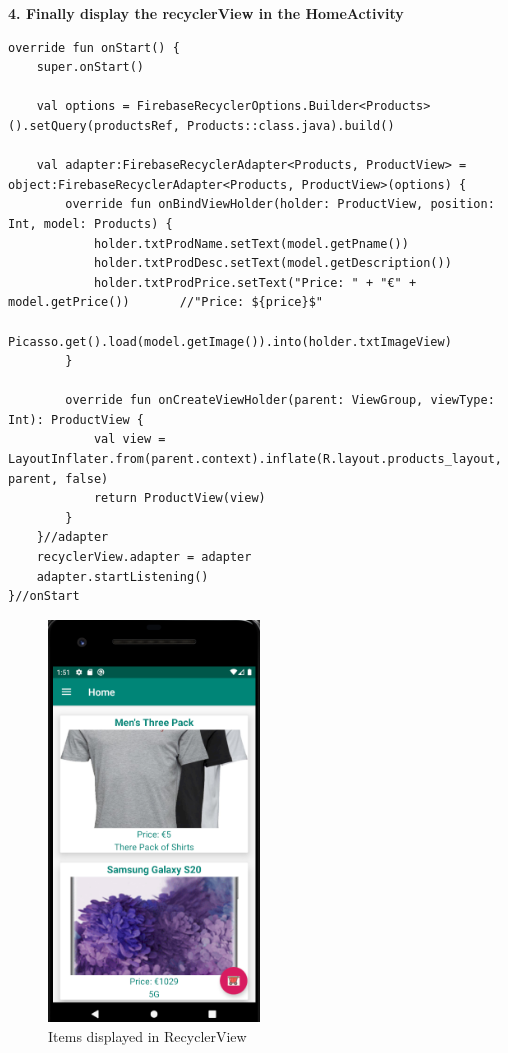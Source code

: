 \textbf{4. Finally display the recyclerView in the HomeActivity}
\begin{verbatim}
override fun onStart() {
    super.onStart()

    val options = FirebaseRecyclerOptions.Builder<Products>().setQuery(productsRef, Products::class.java).build()

    val adapter:FirebaseRecyclerAdapter<Products, ProductView> = object:FirebaseRecyclerAdapter<Products, ProductView>(options) {
        override fun onBindViewHolder(holder: ProductView, position: Int, model: Products) {
            holder.txtProdName.setText(model.getPname())
            holder.txtProdDesc.setText(model.getDescription())
            holder.txtProdPrice.setText("Price: " + "€" + model.getPrice())       //"Price: ${price}$"
            Picasso.get().load(model.getImage()).into(holder.txtImageView)
        }

        override fun onCreateViewHolder(parent: ViewGroup, viewType: Int): ProductView {
            val view = LayoutInflater.from(parent.context).inflate(R.layout.products_layout, parent, false)
            return ProductView(view)
        }
    }//adapter
    recyclerView.adapter = adapter
    adapter.startListening()
}//onStart

\end{verbatim}

\begin{figure}[h!]
	\caption{Items displayed in RecyclerView}
	\label{productview}
	\centering
	\includegraphics[width=0.5\textwidth]{Images/recycle_view_products.png}
\end{figure}
\newpage

